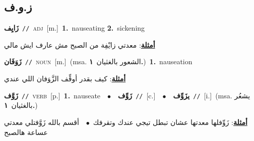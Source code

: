 \documentclass[10pt,a4paper,twoside]{article} %
\begin{document}
\begin{multicols}{2}
\vspace{-3mm}
\subsection*{\color{blue}\foreignlanguage{arabic}{ز.و.ف}\color{blue}{}} 

{\setlength\topsep{0pt}\textbf{\foreignlanguage{arabic}{زَايِف}}\ {\color{gray}\texttt{//}\color{black}}\ \textsc{adj}\ [m.]\ \textbf{1.}~nauseating  \textbf{2.}~sickening\  \begin{flushright}\color{gray}\foreignlanguage{arabic}{\textbf{\underline{\foreignlanguage{arabic}{أمثلة}}}: معدتي زايْفِة من الصبح مش عارف ايش مالي}\end{flushright}\color{black}} \vspace{2mm}

{\setlength\topsep{0pt}\textbf{\foreignlanguage{arabic}{زَوَفَان}}\ {\color{gray}\texttt{//}\color{black}}\ \textsc{noun}\ [m.]\ \color{gray}(msa. \foreignlanguage{arabic}{الشعور بالغثيان}~\foreignlanguage{arabic}{\textbf{١.}})\color{black}\ \textbf{1.}~nauseation\  \begin{flushright}\color{gray}\foreignlanguage{arabic}{\textbf{\underline{\foreignlanguage{arabic}{أمثلة}}}: كيف بقدر أوقِّف الزَّوَفان اللي عندي}\end{flushright}\color{black}} \vspace{2mm}

{\setlength\topsep{0pt}\textbf{\foreignlanguage{arabic}{زَوَّف}}\ {\color{gray}\texttt{//}\color{black}}\ \textsc{verb}\ [p.]\ \textbf{1.}~nauseate\ \ $\bullet$\ \ \setlength\topsep{0pt}\textbf{\foreignlanguage{arabic}{زَوِّف}}\ {\color{gray}\texttt{//}\color{black}}\ [c.]\ \ $\bullet$\ \ \setlength\topsep{0pt}\textbf{\foreignlanguage{arabic}{يزَوِّف}}\ {\color{gray}\texttt{//}\color{black}}\ [i.]\ \color{gray}(msa. \foreignlanguage{arabic}{يشعُر بالغثيان}~\foreignlanguage{arabic}{\textbf{١.}})\color{black}\  \begin{flushright}\color{gray}\foreignlanguage{arabic}{\textbf{\underline{\foreignlanguage{arabic}{أمثلة}}}: زَوِّفلها معدتها عشان تبطل تيجي عندك وتقرفك\ $\bullet$\ \  أقسم بالله زَوَّفتلي معدتي عساعة هالصبح}\end{flushright}\color{black}} \vspace{2mm}


\end{multicols}
\end{document}
